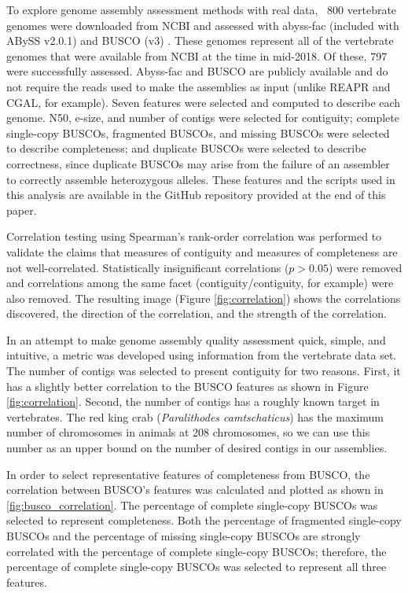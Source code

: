 \documentclass[twocolumn, dvipsnames]{bmcart}%
\begin{document}
To explore genome assembly assessment methods with real data, ~800 vertebrate genomes were downloaded from NCBI and assessed with abyss-fac (included with ABySS v2.0.1)\cite{Simpson2009} and BUSCO (v3) \cite{Simao2015, Waterhouse2017}. These genomes represent all of the vertebrate genomes that were available from NCBI at the time in mid-2018. Of these, 797 were successfully assessed. Abyss-fac and BUSCO are publicly available and do not require the reads used to make the assemblies as input (unlike REAPR and CGAL, for example). Seven features were selected and computed to describe each genome. N50, e-size, and number of contigs were selected for contiguity; complete single-copy BUSCOs, fragmented BUSCOs, and missing BUSCOs were selected to describe completeness; and duplicate BUSCOs were selected to describe correctness, since duplicate BUSCOs may arise from the failure of an assembler to correctly assemble heterozygous alleles. These features and the scripts used in this analysis are available in the GitHub repository provided at the end of this paper.

Correlation testing using Spearman's rank-order correlation was performed to validate the claims that measures of contiguity and measures of completeness are not well-correlated. Statistically insignificant correlations ($p > 0.05$) were removed and correlations  among the same facet (contiguity/contiguity, for example) were also removed. The resulting image (Figure \ref{fig:correlation}) shows the correlations discovered, the direction of the correlation, and the strength of the correlation.


In an attempt to make genome assembly quality assessment quick, simple, and intuitive, a metric was developed using information from the vertebrate data set. The number of contigs was selected to present contiguity for two reasons. First, it has a slightly better correlation to the BUSCO features as shown in Figure \ref{fig:correlation}. Second, the number of contigs has a roughly known target in vertebrates. The red king crab (\textit{Paralithodes camtschaticus}) has the maximum number of chromosomes in animals at 208 chromosomes, so we can use this number as an upper bound on the number of desired contigs in our assemblies.


In order to select representative features of completeness from BUSCO, the correlation between BUSCO's features was calculated and plotted as shown in \ref{fig:busco_correlation}. The percentage of complete single-copy BUSCOs was selected to represent completeness. Both the percentage of fragmented single-copy BUSCOs and the percentage of missing single-copy BUSCOs are strongly correlated with the percentage of complete single-copy BUSCOs; therefore, the percentage of complete single-copy BUSCOs was selected to represent all three features.
\end{document}
